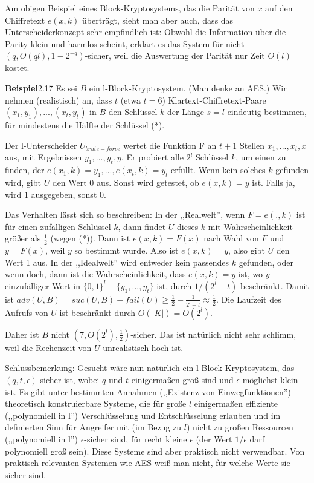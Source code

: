 \documentclass[a4paper]{article}
\begin{document}
\begin{multicols}{3}
    Am obigen Beispiel eines Block-Kryptosystems, das die Parität von $x$ auf den Chiffretext $e(x,k)$ überträgt, sieht man aber auch, dass das Unterscheiderkonzept sehr empfindlich ist: Obwohl die Information über die Parity klein und harmlos scheint, erklärt es das System für nicht $(q,O(ql), 1-2^{-q})$-sicher, weil die Auswertung der Parität nur Zeit $O(l)$ kostet.

    \textbf{Beispiel}2.17 Es sei $B$ ein l-Block-Kryptosystem. (Man denke an AES.) Wir nehmen (realistisch) an, dass $t$ (etwa $t=6$) Klartext-Chiffretext-Paare $(x_1,y_1),...,(x_t,y_t)$ in $B$ den Schlüssel $k$ der Länge $s=l$ eindeutig bestimmen, für mindestens die Hälfte der Schlüssel (*).

    Der l-Unterscheider $U_{brute-force}$ wertet die Funktion F an $t+1$ Stellen $x_1,...,x_t,x$ aus, mit Ergebnissen $y_1,...,y_t,y$. Er probiert alle $2^l$ Schlüssel $k$, um einen zu finden, der $e(x_1,k)=y_1 ,...,e(x_t,k) =y_t$ erfüllt. Wenn kein solches $k$ gefunden wird, gibt $U$ den Wert $0$ aus.
    Sonst wird getestet, ob $e(x,k)=y$ ist. Falls ja, wird $1$ ausgegeben, sonst $0$.

    Das Verhalten lässt sich so beschreiben: In der ,,Realwelt'', wenn $F=e(.,k)$ ist für einen zufälligen Schlüssel $k$, dann findet $U$ dieses $k$ mit Wahrscheinlichkeit größer als $\frac{1}{2}$ (wegen (*)). Dann ist $e(x,k) =F(x)$ nach Wahl von $F$ und $y=F(x)$, weil $y$ so bestimmt wurde.
    Also ist $e(x,k) =y$, also gibt $U$ den Wert 1 aus. In der ,,Idealwelt'' wird entweder kein passendes $k$ gefunden, oder wenn doch, dann ist die Wahrscheinlichkeit, dass $e(x,k) =y$ ist, wo $y$ einzufälliger Wert in $\{0,1\}^l-\{y_1,...,y_t\}$ ist, durch $1/(2^l-t)$ beschränkt. Damit ist $adv(U,B) = suc(U,B)-fail(U)\geq \frac{1}{2}-\frac{1}{2^l-t}\approx\frac{1}{2}$.
    Die Laufzeit des Aufrufs von $U$ ist beschränkt durch $O(|K|) =O(2^l)$.

    Daher ist $B$ nicht $(7, O(2^l),\frac{1}{2})$-sicher. Das ist natürlich nicht sehr schlimm, weil die Rechenzeit von $U$ unrealistisch hoch ist.

    Schlussbemerkung: Gesucht wäre nun natürlich ein l-Block-Kryptosystem, das $(q,t,\epsilon)$-sicher ist, wobei $q$ und $t$ einigermaßen groß sind und $\epsilon$ möglichst klein ist. Es gibt unter bestimmten Annahmen (,,Existenz von Einwegfunktionen'') theoretisch konstruierbare Systeme, die für große $l$ einigermaßen effiziente (,,polynomiell in l'') Verschlüsselung und Entschlüsselung erlauben und im definierten Sinn für Angreifer mit (im Bezug zu $l$) nicht zu großen Ressourcen (,,polynomiell in l'') $\epsilon$-sicher sind, für recht kleine $\epsilon$ (der Wert $1/\epsilon$ darf polynomiell groß sein). Diese Systeme sind aber praktisch nicht verwendbar. Von praktisch relevanten Systemen wie AES weiß man nicht, für welche Werte sie sicher sind.


\end{multicols}
\end{document}
